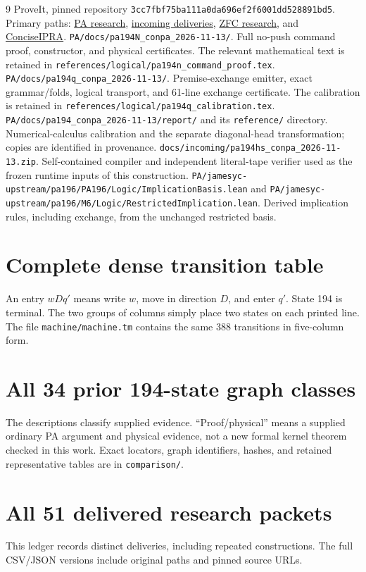\documentclass[11pt,letterpaper]{article}
\newcommand{\file}[1]{\nolinkurl{#1}}
\newcommand{\snap}{\texttt{3cc7fbf75ba111a0da696ef2f6001dd528891bd5}}
\begin{document}
\begin{thebibliography}{9}
 ProveIt, pinned repository \snap. Primary paths:
\href{https://github.com/VladimirReshetnikov/ProveIt/tree/3cc7fbf75ba111a0da696ef2f6001dd528891bd5/Computability/BusyBeaver/Research/PA}{PA research},
\href{https://github.com/VladimirReshetnikov/ProveIt/tree/3cc7fbf75ba111a0da696ef2f6001dd528891bd5/docs/incoming}{incoming deliveries},
\href{https://github.com/VladimirReshetnikov/ProveIt/tree/3cc7fbf75ba111a0da696ef2f6001dd528891bd5/Computability/BusyBeaver/Research/ZFC}{ZFC research}, and
\href{https://github.com/VladimirReshetnikov/ProveIt/tree/3cc7fbf75ba111a0da696ef2f6001dd528891bd5/Logic/PrimitiveRecursiveArithmetic/ConciseIPRA}{ConciseIPRA}.
 \file{PA/docs/pa194N_conpa_2026-11-13/}.
Full no-push command proof, constructor, and physical certificates.
The relevant mathematical text is retained in
\file{references/logical/pa194n_command_proof.tex}.
 \file{PA/docs/pa194q_conpa_2026-11-13/}.
Premise-exchange emitter, exact grammar/folds, logical transport, and
61-line exchange certificate. The calibration is retained in
\file{references/logical/pa194q_calibration.tex}.
 \file{PA/docs/pa194_conpa_2026-11-13/report/} and its
\file{reference/} directory. Numerical-calculus calibration and the
separate diagonal-head transformation; copies are identified in provenance.
 \file{docs/incoming/pa194hs_conpa_2026-11-13.zip}.
Self-contained compiler and independent literal-tape verifier used as
the frozen runtime inputs of this construction.
 \file{PA/jamesyc-upstream/pa196/PA196/Logic/ImplicationBasis.lean}
and \file{PA/jamesyc-upstream/pa196/M6/Logic/RestrictedImplication.lean}. Derived implication
rules, including exchange, from the unchanged restricted basis.
\end{thebibliography}

\clearpage\appendix
\section{Complete dense transition table}\label{app:table}
An entry $wDq'$ means write $w$, move in direction $D$, and enter $q'$.
State 194 is terminal. The two groups of columns simply place two states
on each printed line. The file \file{machine/machine.tm} contains the
same 388 transitions in five-column form.

\clearpage
\section{All 34 prior 194-state graph classes}\label{app:frontier}
The descriptions classify supplied evidence. ``Proof/physical'' means a
supplied ordinary PA argument and physical evidence, not a new formal
kernel theorem checked in this work. Exact locators, graph identifiers,
hashes, and retained representative tables are in \file{comparison/}.

\clearpage
\section{All 51 delivered research packets}\label{app:ledger}
This ledger records distinct deliveries, including repeated constructions.
The full CSV/JSON versions include original paths and pinned source URLs.

\end{document}
